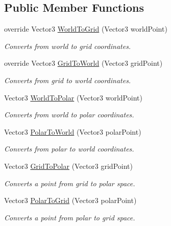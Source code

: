\subsection*{Public Member Functions}
\begin{DoxyCompactItemize}
\item 
override Vector3 \hyperlink{class_g_f_polar_grid_a925bc4556e0c7422f476409b4f48067e_a925bc4556e0c7422f476409b4f48067e}{World\+To\+Grid} (Vector3 world\+Point)
\begin{DoxyCompactList}\small\item\em Converts from world to grid coordinates.\end{DoxyCompactList}\item 
override Vector3 \hyperlink{class_g_f_polar_grid_a80a4698250b08f212f3681abadbc5012_a80a4698250b08f212f3681abadbc5012}{Grid\+To\+World} (Vector3 grid\+Point)
\begin{DoxyCompactList}\small\item\em Converts from grid to world coordinates.\end{DoxyCompactList}\item 
Vector3 \hyperlink{class_g_f_polar_grid_a4fb1df768f7700590e23205e089dc58d_a4fb1df768f7700590e23205e089dc58d}{World\+To\+Polar} (Vector3 world\+Point)
\begin{DoxyCompactList}\small\item\em Converts from world to polar coordinates.\end{DoxyCompactList}\item 
Vector3 \hyperlink{class_g_f_polar_grid_a3dc57117173969cf60d3275e533a3ff8_a3dc57117173969cf60d3275e533a3ff8}{Polar\+To\+World} (Vector3 polar\+Point)
\begin{DoxyCompactList}\small\item\em Converts from polar to world coordinates.\end{DoxyCompactList}\item 
Vector3 \hyperlink{class_g_f_polar_grid_a2a571c5fc91475f86f7643f45fc1c265_a2a571c5fc91475f86f7643f45fc1c265}{Grid\+To\+Polar} (Vector3 grid\+Point)
\begin{DoxyCompactList}\small\item\em Converts a point from grid to polar space.\end{DoxyCompactList}\item 
Vector3 \hyperlink{class_g_f_polar_grid_a7e4ceb8cf00db2c36b74ef76ecaa2a15_a7e4ceb8cf00db2c36b74ef76ecaa2a15}{Polar\+To\+Grid} (Vector3 polar\+Point)
\begin{DoxyCompactList}\small\item\em Converts a point from polar to grid space.\end{DoxyCompactList}\item 

\end{DoxyCompactItemize}
